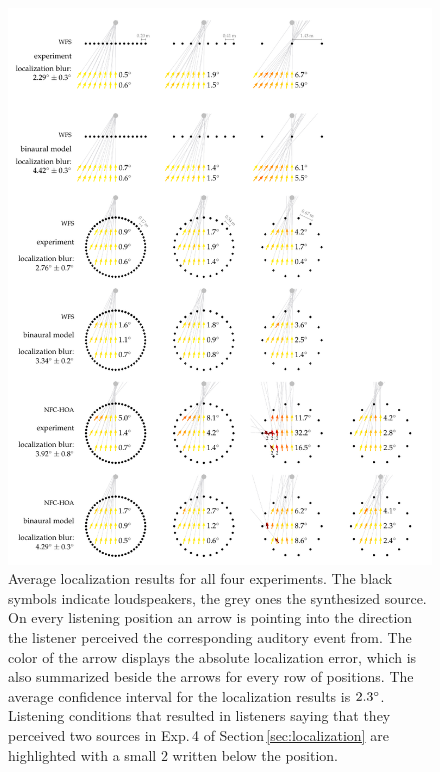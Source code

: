 \renewcommand{\thefigure}{\thechapter.\arabic{figure}a} %
\begin{figure}
    \centering
    \hspace*{-1.2cm}\includegraphics{fig6_03/fig6_03a}
    \caption{Average localization results for all four experiments. The black
    symbols indicate loudspeakers, the grey ones the synthesized source. On
    every listening position an arrow is pointing into the direction the
    listener perceived the corresponding auditory event from. The color of the arrow
    displays the absolute localization error, which is also summarized beside
    the arrows for every row of positions. The average confidence interval for
    the localization results is $2.3^\circ$. Listening conditions that
    resulted in listeners saying that they perceived two sources in Exp.\,4 of
    Section\,\protect\ref{sec:localization} are
    highlighted with a small $2$ written below the position.
    }
    \label{fig:localization_results_model}
\end{figure}
